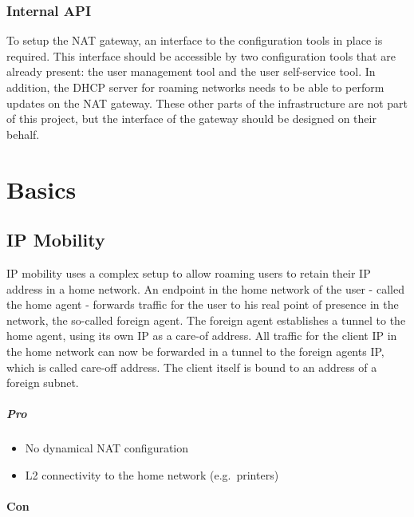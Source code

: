 \documentclass{report}
\begin{document}
\subsection{Internal API}\label{internal-api}

To setup the NAT gateway, an interface to the configuration tools in
place is required. This interface should be accessible by two
configuration tools that are already present: the user management tool
and the user self-service tool. In addition, the DHCP server for roaming
networks needs to be able to perform updates on the NAT gateway. These
other parts of the infrastructure are not part of this project, but the
interface of the gateway should be designed on their behalf.

\chapter{Basics}\label{basics}

\section{IP Mobility}\label{ip-mobility}

IP mobility\cite{IPMob}\cite{MobileIP-cisco} uses a complex setup to allow roaming users to retain their
IP address in a home network. An endpoint in the home network of the
user - called the home agent - forwards traffic for the user to his real
point of presence in the network, the so-called foreign agent. The
foreign agent establishes a tunnel to the home agent, using its own IP
as a care-of address. All traffic for the client IP in the home network
can now be forwarded in a tunnel to the foreign agents IP, which is
called care-off address. The client itself is bound to an address of a
foreign subnet.

\paragraph{Pro}\label{pro}

\begin{itemize}
\itemsep1pt\parskip0pt
\item
  No dynamical NAT configuration
\item
  L2 connectivity to the home network (e.g.~printers)
\end{itemize}

\subsubsection{Con}\label{con}
\end{document}
